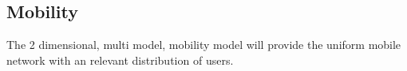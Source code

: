 \subsection{Mobility}
The 2 dimensional, multi model, mobility model \cite{bettstetter2001smooth} will provide the uniform mobile network with an relevant distribution of users.